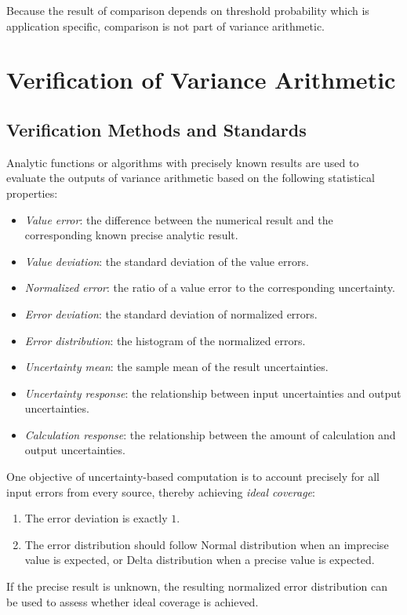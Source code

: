 \documentclass[twoside]{article}
\numberwithin{equation}{section}
\newcommand{\Verbose}{}
\begin{document}
Because the result of comparison depends on threshold probability which is application specific, comparison is not part of variance arithmetic.






\ifdefined\Verbose
\clearpage
\fi
\section{Verification of Variance Arithmetic}
\label{sec: validation}

\subsection{Verification Methods and Standards}

Analytic functions or algorithms with precisely known results are used to evaluate the outputs of variance arithmetic based on the following statistical properties: 
\begin{itemize}

\item \emph{Value error}: the difference between the numerical result and the corresponding known precise analytic result.

\item \emph{Value deviation}: the standard deviation of the value errors.

\item \emph{Normalized error}: the ratio of a value error to the corresponding uncertainty.

\item \emph{Error deviation}: the standard deviation of normalized errors.

\item \emph{Error distribution}: the histogram of the normalized errors.

\item \emph{Uncertainty mean}: the sample mean of the result uncertainties.

\item \emph{Uncertainty response}: the relationship between input uncertainties and output uncertainties.

\item \emph{Calculation response}: the relationship between the amount of calculation and output uncertainties.

\end{itemize}

One objective of uncertainty-based computation is to account precisely for all input errors from every source, thereby achieving \emph{ideal coverage}:
\begin{enumerate}
\item The error deviation is exactly $1$.

\item The error distribution should follow Normal distribution when an imprecise value is expected, or Delta distribution when a precise value is expected.

\end{enumerate}
If the precise result is unknown, the resulting normalized error distribution can be used to assess whether ideal coverage is achieved.
\end{document}
